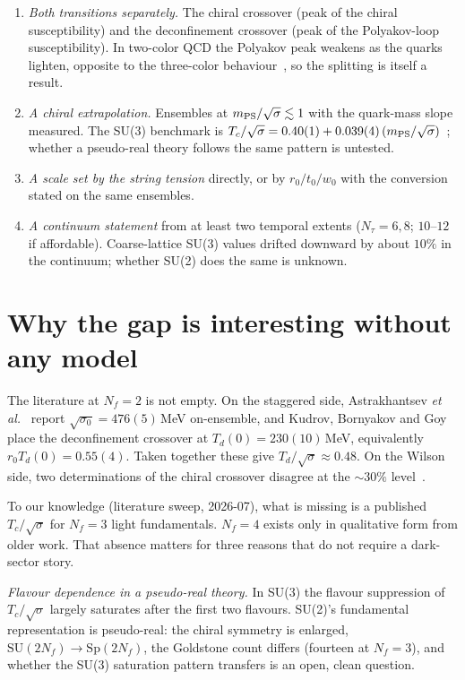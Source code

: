 \documentclass[aps,prd,twocolumn,superscriptaddress,nofootinbib,10pt]{revtex4-2}
\begin{document}
\begin{enumerate}
\item \emph{Both transitions separately.} The chiral crossover (peak of the chiral susceptibility)
  and the deconfinement crossover (peak of the Polyakov-loop susceptibility). In two-color QCD the
  Polyakov peak weakens as the quarks lighten, opposite to the three-color behaviour~\cite{Kaczmarek1999},
  so the splitting is itself a result.
\item \emph{A chiral extrapolation.} Ensembles at $m_{\rm PS}/\sqrt{\sigma}\lesssim 1$ with the
  quark-mass slope measured. The SU(3) benchmark is
  $T_c/\sqrt{\sigma} = 0.40(1) + 0.039(4)\,(m_{\rm PS}/\sqrt{\sigma})$~\cite{Karsch2001}; whether a
  pseudo-real theory follows the same pattern is untested.
\item \emph{A scale set by the string tension} directly, or by $r_0/t_0/w_0$ with the conversion
  stated on the same ensembles.
\item \emph{A continuum statement} from at least two temporal extents ($N_\tau=6,8$; $10$--$12$ if
  affordable). Coarse-lattice SU(3) values drifted downward by about $10\%$ in the continuum; whether
  SU(2) does the same is unknown.
\end{enumerate}

\section{Why the gap is interesting without any model}

The literature at $N_f=2$ is not empty. On the staggered side, Astrakhantsev \emph{et al.}~\cite{Astrakhantsev2019}
report $\sqrt{\sigma_0}=476(5)\,$MeV on-ensemble, and Kudrov, Bornyakov and Goy~\cite{Kudrov2025}
place the deconfinement crossover at $T_d(0)=230(10)\,$MeV, equivalently $r_0 T_d(0)=0.55(4)$.
Taken together these give $T_d/\sqrt{\sigma}\approx 0.48$. On the Wilson side, two determinations of
the chiral crossover disagree at the $\sim\!30\%$ level~\cite{Iida2020,Iida2024}.

To our knowledge (literature sweep, 2026-07), what is missing is a published
$T_c/\sqrt{\sigma}$ for $N_f=3$ light fundamentals. $N_f=4$ exists only in qualitative form from
older work. That absence matters for three reasons that do not require a dark-sector story.

\emph{Flavour dependence in a pseudo-real theory.} In SU(3) the flavour suppression of
$T_c/\sqrt{\sigma}$ largely saturates after the first two flavours. SU(2)'s fundamental
representation is pseudo-real: the chiral symmetry is enlarged, $\mathrm{SU}(2N_f)\to\mathrm{Sp}(2N_f)$,
the Goldstone count differs (fourteen at $N_f=3$), and whether the SU(3) saturation pattern
transfers is an open, clean question.
\end{document}
